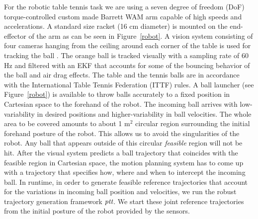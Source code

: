 \documentclass[letterpaper, 10 pt, conference]{ieeeconf}
\newcommand{\alg}{\emph{ptt}} %
\begin{document}

For the robotic table tennis task we are using a seven degree of freedom (DoF) torque-controlled custom made Barrett WAM arm capable of high speeds and accelerations. A standard size racket (16 cm diameter) is mounted on the end-effector of the arm as can be seen in Figure~\ref{robot}. A vision system consisting of four cameras hanging from the ceiling around each corner of the table is used for tracking the ball \cite{Lampert12}. The orange ball is tracked visually with a sampling rate of 60 Hz and filtered with an EKF that accounts for some of the bouncing behavior of the ball and air drag effects. The table and the tennis balls are in accordance with the International Table Tennis Federation (ITTF) rules.
%
A ball launcher (see Figure~\ref{robot}) is available to throw balls accurately to a fixed position in Cartesian space to the forehand of the robot. The incoming ball arrives with low-variability in desired positions and higher-variability in ball velocities. The whole area to be covered amounts to about 1 m$^2$ circular region surrounding the initial forehand posture of the robot. This allows us to avoid the singularities of the robot. Any ball that appears outside of this circular \emph{feasible} region will not be hit.
%
After the visual system predicts a ball trajectory that coincides with the feasible region in Cartesian space, the motion planning system has to come up with a trajectory that specifies how, where and when to intercept the incoming ball. 
%
In runtime, in order to generate feasible reference trajectories that account for the variations in incoming ball position and velocities, we run the robust trajectory generation framework $\alg$. We start these joint reference trajectories from the initial posture of the robot provided by the sensors.
\end{document}
